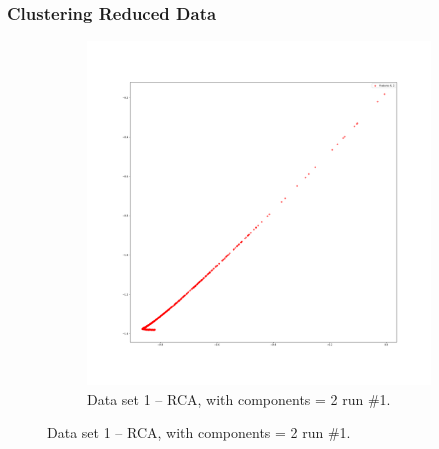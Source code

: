 \documentclass[
letterpaper, %
]{IEEEtran}
\begin{document}
	\subsubsection{Clustering Reduced Data}
	\begin{figure}[!b]
		\begin{subfigure}{1.0\linewidth}
			\centering
			\includegraphics[width=\linewidth]{./images/ds1/rca/scatter/run1.png}
			\caption{Data set 1 -- RCA, with components = 2 run \#1.}
			\label{fig:rcarun1}
		\end{subfigure}
	\end{figure}
\end{document}
